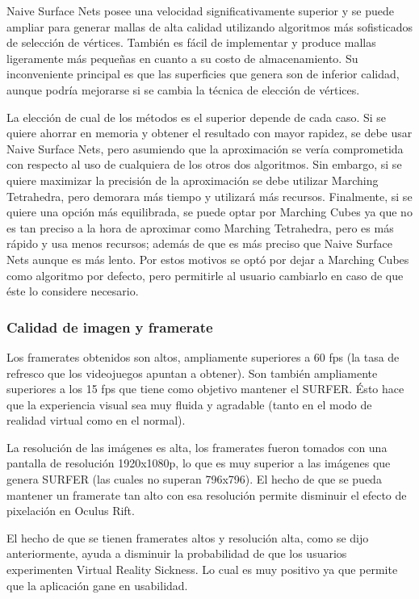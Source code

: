 \documentclass[12pt]{article}
\begin{document}
Naive Surface Nets posee una velocidad significativamente superior y se puede ampliar para generar mallas de alta calidad utilizando algoritmos más sofisticados de selección de vértices. También es fácil de implementar y produce mallas ligeramente más pequeñas en cuanto a su costo de almacenamiento. Su inconveniente principal es que las superficies que genera son de inferior calidad, aunque podría mejorarse si se cambia la técnica de elección de vértices. 

La elección de cual de los métodos es el superior depende de cada caso. Si se quiere ahorrar en memoria y obtener el resultado con mayor rapidez, se debe usar Naive Surface Nets, pero asumiendo que la aproximación se vería comprometida con respecto al uso de cualquiera de los otros dos algoritmos. Sin embargo, si se quiere maximizar la precisión de la aproximación se debe utilizar Marching Tetrahedra, pero demorara más tiempo y utilizará más recursos. Finalmente, si se quiere una opción más equilibrada, se puede optar por Marching Cubes ya que no es tan preciso a la hora de aproximar como Marching Tetrahedra, pero es más rápido y usa menos recursos; además de que es más preciso que Naive Surface Nets aunque es más lento. Por estos motivos se optó por dejar a Marching Cubes como algoritmo por defecto, pero permitirle al usuario cambiarlo en caso de que éste lo considere necesario.
\subsubsection{Calidad de imagen y framerate}
Los framerates obtenidos son altos, ampliamente superiores a 60 fps (la tasa de refresco que los videojuegos apuntan a obtener). Son también ampliamente superiores a los 15 fps que tiene como objetivo mantener el SURFER. Ésto hace que la experiencia visual sea muy fluida y agradable (tanto en el modo de realidad virtual como en el normal). 

La resolución de las imágenes es alta, los framerates fueron tomados con una pantalla de resolución 1920x1080p, lo que es muy superior a las imágenes que genera SURFER (las cuales no superan 796x796). El hecho de que se pueda mantener un framerate tan alto con esa resolución permite disminuir el efecto de pixelación en Oculus Rift. 

El hecho de que se tienen framerates altos y resolución alta, como se dijo anteriormente, ayuda a disminuir la probabilidad de que los usuarios experimenten Virtual Reality Sickness. Lo cual es muy positivo ya que permite que la aplicación gane en usabilidad.
\end{document}
